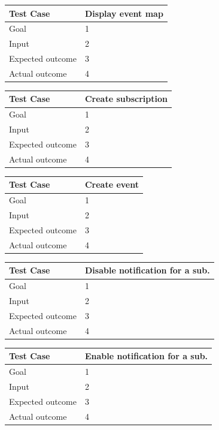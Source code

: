 \documentclass[a4paper]{scrreprt}
\begin{document}
\bigskip
\noindent
\begin{tabularx}{\linewidth}{|l|X|}
	\hline
	\textbf{Test Case} 	& \textbf{Display event map} \\ \hline
	Goal 				& 1 \\ \hline
	Input 				& 2 \\ \hline
	Expected outcome 	& 3 \\ \hline
	Actual outcome 		& 4 \\ \hline
\end{tabularx}
\bigskip
\noindent
\begin{tabularx}{\linewidth}{|l|X|}
	\hline
	\textbf{Test Case} 	& \textbf{Create subscription} \\ \hline
	Goal 				& 1 \\ \hline
	Input 				& 2 \\ \hline
	Expected outcome 	& 3 \\ \hline
	Actual outcome 		& 4 \\ \hline
\end{tabularx}
\bigskip
\noindent
\begin{tabularx}{\linewidth}{|l|X|}
	\hline
	\textbf{Test Case} 	& \textbf{Create event} \\ \hline
	Goal 				& 1 \\ \hline
	Input 				& 2 \\ \hline
	Expected outcome 	& 3 \\ \hline
	Actual outcome 		& 4 \\ \hline
\end{tabularx}
\bigskip
\noindent
\begin{tabularx}{\linewidth}{|l|X|}
	\hline
	\textbf{Test Case} 	& \textbf{Disable notification for a sub.} \\ \hline
	Goal 				& 1 \\ \hline
	Input 				& 2 \\ \hline
	Expected outcome 	& 3 \\ \hline
	Actual outcome 		& 4 \\ \hline
\end{tabularx}
\bigskip
\noindent
\begin{tabularx}{\linewidth}{|l|X|}
	\hline
	\textbf{Test Case} 	& \textbf{Enable notification for a sub.} \\ \hline
	Goal 				& 1 \\ \hline
	Input 				& 2 \\ \hline
	Expected outcome 	& 3 \\ \hline
	Actual outcome 		& 4 \\ \hline
\end{tabularx}
\end{document}
